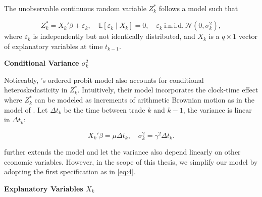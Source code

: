 The unobservable continuous random variable $Z^*_k$ follows a model such that

\begin{equation}
Z_k^* = X_k' \beta + \varepsilon_k, \quad \mathbb{E}[\varepsilon_k \mid X_k] = 0, \quad \varepsilon_k \ \text{i.n.i.d.} \ \mathcal{N}(0, \sigma_k^2),
    \label{eq:3}
\end{equation}
where \(\varepsilon_k\) is independently but not identically distributed, and $X_k$ is a \(q\times1\) vector of explanatory variables at time $t_{k-1}$.

{\noindent\bfseries Conditional Variance \(\sigma_k^2\)}

Noticeably, \citet{hausman1992}'s ordered probit model also accounts for conditional heteroskedasticity in $Z^*_k$. Intuitively, their model incorporates the clock-time effect where $Z^*_k$ can be modeled as increments of arithmetic Brownian motion as in the model of \citet{chofrees1988}. Let \(\Delta t_k\) be the time between trade $k$ and $k-1$, the variance is linear in \(\Delta t_k\):

\begin{equation}
X_k' \beta = \mu \Delta t_k, \quad \sigma_k^2 = \gamma^2 \Delta t_k.
    \label{eq:4}
\end{equation}

\citet{hausman1992} further extends the model and let the variance also depend linearly on other economic variables.
However, in the scope of this thesis, we simplify our model by adopting the first specification as in \eqref{eq:4}.

{\noindent\bfseries Explanatory Variables $X_k$ }

